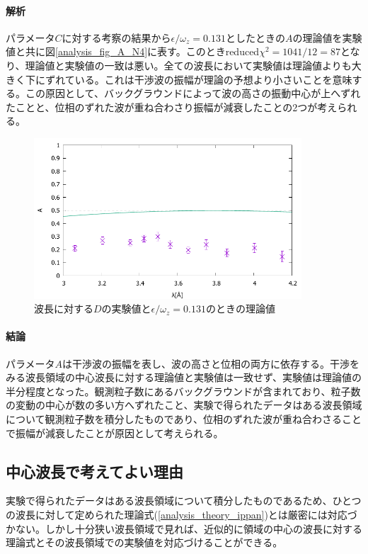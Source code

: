 \paragraph{解析}
パラメータ$C$に対する考察の結果から$\epsilon/\omega_z=0.131$としたときの$A$の理論値を実験値と共に図\ref{analysis_fig_A_N4}に表す。このときreduced$\chi^2=1041/12=87$となり、理論値と実験値の一致は悪い。全ての波長において実験値は理論値よりも大きく下にずれている。これは干渉波の振幅が理論の予想より小さいことを意味する。この原因として、バックグラウンドによって波の高さの振動中心が上へずれたことと、位相のずれた波が重ね合わさり振幅が減衰したことの2つが考えられる。
\begin{figure}[h]
\centering
\includegraphics[width=10cm]{analysis/A/A_F_N4.pdf}
\caption{波長に対する$D$の実験値と$\epsilon/\omega_z=0.131$のときの理論値}
\end{figure}

\paragraph{結論}
パラメータ$A$は干渉波の振幅を表し、波の高さと位相の両方に依存する。干渉をみる波長領域の中心波長に対する理論値と実験値は一致せず、実験値は理論値の半分程度となった。観測粒子数にあるバックグラウンドが含まれており、粒子数の変動の中心が数の多い方へずれたこと、実験で得られたデータはある波長領域について観測粒子数を積分したものであり、位相のずれた波が重ね合わさることで振幅が減衰したことが原因として考えられる。

\subsection{中心波長で考えてよい理由}
実験で得られたデータはある波長領域について積分したものであるため、ひとつの波長に対して定められた理論式(\ref{analysis_theory_ippan})とは厳密には対応づかない。しかし十分狭い波長領域で見れば、近似的に領域の中心の波長に対する理論式とその波長領域での実験値を対応づけることができる。

